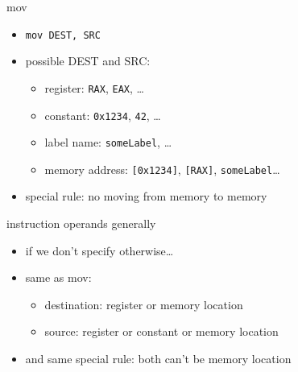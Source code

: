 \begin{frame}[fragile,label=mov]{mov}
\lstset{language=myasm}
\begin{itemize}
\item \lstinline|mov DEST, SRC|
\item possible DEST and SRC:
\begin{itemize}
\item register: \texttt{RAX}, \texttt{EAX}, \ldots
\item constant: \texttt{0x1234}, \texttt{42}, \ldots
\item label name: \texttt{someLabel}, \ldots
\item memory address: \texttt{[0x1234]}, \texttt{[RAX]}, \texttt{someLabel}\ldots
\end{itemize}
\item special rule: no moving from memory to memory
\end{itemize}
\end{frame}

\begin{frame}{instruction operands generally}
\begin{itemize}
\item if we don't specify otherwise\ldots
\item same as mov:
    \begin{itemize}
    \item destination: register or memory location
    \item source: register or constant or memory location
    \end{itemize}
\item and same special rule: both can't be memory location
\end{itemize}
\end{frame}
